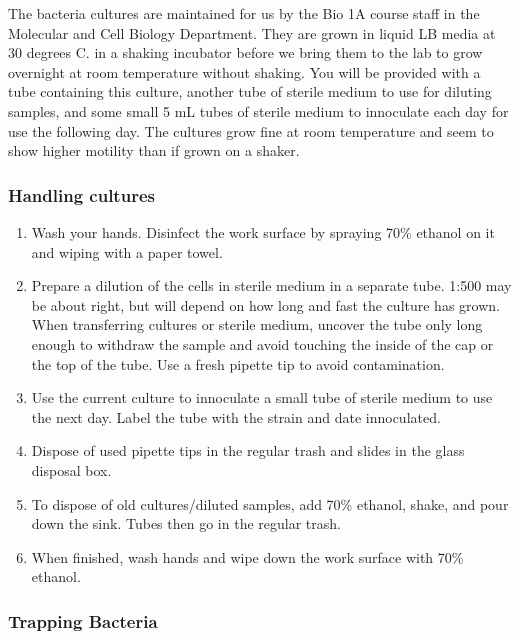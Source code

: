 \documentclass{../lab}
\begin{document}
The bacteria cultures are maintained for us by the Bio 1A course staff in the Molecular and Cell Biology Department. They are grown in liquid LB media at 30 degrees C. in a shaking incubator before we bring them to the lab to grow overnight at room temperature without shaking. You will be provided with a tube containing this culture, another tube of sterile medium to use for diluting samples, and some small 5 mL tubes of sterile medium to innoculate each day for use the following day. The cultures grow fine at room temperature and seem to show higher motility than if grown on a shaker.

\subsubsection{Handling cultures}

\begin{enumerate}
    \item Wash your hands. Disinfect the work surface by spraying 70\% ethanol on it and wiping with a paper towel.

    \item Prepare a dilution of the cells in sterile medium in a separate tube. 1:500 may be about right, but will depend on how long and fast the culture has grown. When transferring cultures or sterile medium, uncover the tube only long enough to withdraw the sample and avoid touching the inside of the cap or the top of the tube. Use a fresh pipette tip to avoid contamination.

    \item Use the current culture to innoculate a small tube of sterile medium to use the next day. Label the tube with the strain and date innoculated.

    \item Dispose of used pipette tips in the regular trash and slides in the glass disposal box.

    \item To dispose of old cultures/diluted samples, add 70\% ethanol, shake, and pour down the sink. Tubes then go in the regular trash.

    \item When finished, wash hands and wipe down the work surface with 70\% ethanol.

\end{enumerate}

\subsubsection{Trapping Bacteria}
\end{document}
